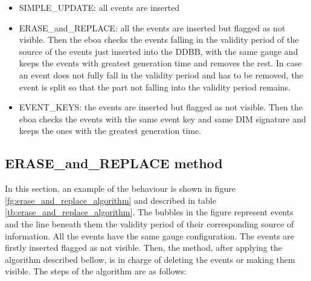 \begin{itemize}
\item SIMPLE\_UPDATE: all events are inserted
\item ERASE\_and\_REPLACE: all the events are inserted but flagged as not visible. Then the \acrshort{eboa} checks the events falling in the validity period of the source of the events just inserted into the DDBB, with the same gauge and keeps the events with greatest generation time and removes the rest. In case an event does not fully fall in the validity period and has to be removed, the event is split so that the part not falling into the validity period remains.
\item EVENT\_KEYS: the events are inserted but flagged as not visible. Then the \acrshort{eboa} checks the events with the same event key and same DIM signature and keeps the ones with the greatest generation time.
\end{itemize}

\subsection {ERASE\_and\_REPLACE method}

In this section, an example of the behaviour is shown in figure \ref{fg:erase_and_replace_algorithm} and described in table \ref{tb:erase_and_replace_algorithm}. The bubbles in the figure represent events and the line beneath them the validity period of their corresponding source of information. All the events have the same gauge configuration.
The events are firstly inserted flagged as not visible. Then, the method, after applying the algorithm described bellow, is in charge of deleting the events or making them visible.
The steps of the algorithm are as follows:


